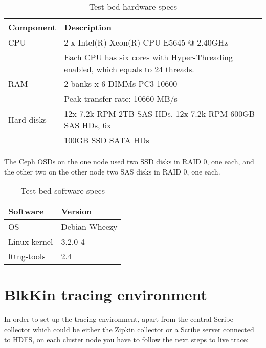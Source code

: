 \begin{table}[H]
    \centering
    \begin{tabular}{ | l | l | }
        \hline
        Component & Description \\ \hline \hline
        CPU &  2 x Intel(R) Xeon(R) CPU E5645 @ 2.40GHz \cite{e5645} \\
         & Each CPU has six cores with Hyper-Threading enabled, which equals to 
         24 threads. \\ \hline
        RAΜ & 2 banks x 6 DIMMs PC3-10600 \\
        & Peak transfer rate: 10660 MB/s \\ \hline
        Hard disks & 12x 7.2k RPM 2TB SAS HDs, 12x 7.2k RPM 600GB SAS HDs, 6x \\
        & 100GB SSD SATA HDs \\ \hline
    \end{tabular}
    \caption{Test-bed hardware specs}
    \label{tab:hardware-specs}
\end{table}

The Ceph OSDs on the one node used two SSD disks in RAID 0, one each, and the
other two on the other node two SAS disks in RAID 0, one each.

\begin{table}[H]
    \centering
    \begin{tabular}{ | l | l | }
        \hline
        Software & Version \\ \hline \hline
        OS &  Debian Wheezy \\ \hline
        Linux kernel & 3.2.0-4 \\ \hline
        lttng-tools & 2.4 \\ \hline
    \end{tabular}
    \caption{Test-bed software specs}
    \label{tab:software-specs}
\end{table}

\section{BlkKin tracing environment}\label{sec:blk-env}
In order to set up the tracing environment, apart from the central Scribe
collector which could be either the Zipkin collector or a Scribe server
connected to HDFS, on each cluster node you have to follow the next steps to
live trace:

